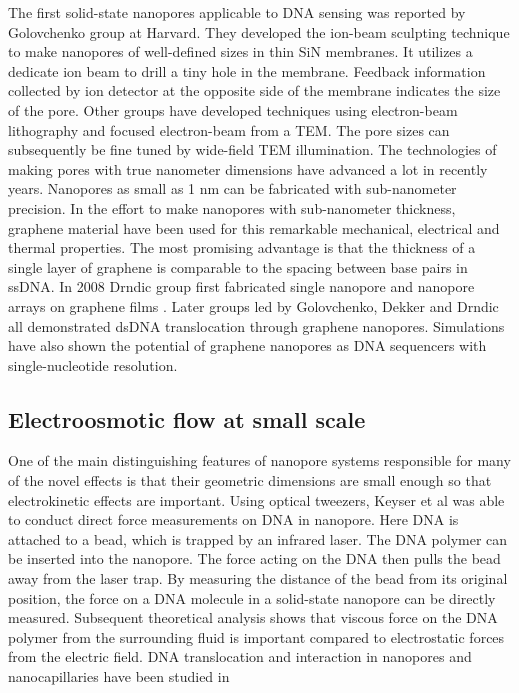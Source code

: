 The first solid-state nanopores applicable to DNA sensing was reported by Golovchenko group at Harvard\cite{Li2001}. They developed the ion-beam sculpting technique to make nanopores of well-defined sizes in thin SiN membranes. It utilizes a dedicate ion beam to drill a tiny hole in the membrane. Feedback information collected by ion detector at the opposite side of the membrane indicates the size of the pore. Other groups have developed techniques using electron-beam lithography and focused electron-beam from a TEM\cite{Dekker2003}. The pore sizes can subsequently be fine tuned by wide-field TEM illumination. The technologies of making pores with true nanometer dimensions have advanced a lot in recently years. Nanopores as small as 1 nm can be fabricated with sub-nanometer precision. In the effort to make nanopores with sub-nanometer thickness, graphene material have been used for this remarkable mechanical, electrical and thermal properties. The most promising advantage is that the thickness of a single layer of graphene is comparable to the spacing between base pairs in ssDNA. In 2008 Drndic group first fabricated single nanopore and nanopore arrays on graphene films \cite{fischbein2008electron}. Later groups led by Golovchenko\cite{Garaj2010}, Dekker\cite{Schneider2010} and Drndic\cite{Merchant2010} all demonstrated dsDNA translocation through graphene nanopores. Simulations have also shown the potential of graphene nanopores as DNA sequencers with single-nucleotide resolution.
 
\subsection{Electroosmotic flow at small scale}
One of the main distinguishing features of nanopore systems responsible for many of the novel effects is that their geometric dimensions are small enough so that electrokinetic effects are important. Using optical tweezers, Keyser et al\cite{Keyser2006,VanDorp2009} was able to conduct direct force measurements on DNA in nanopore. Here DNA is attached to a bead, which is trapped by an infrared laser. The DNA polymer can be inserted into the nanopore. The force acting on the DNA then pulls the bead away from the laser trap. By measuring the distance of the bead from its original position, the force on a DNA molecule in a solid-state nanopore can be directly measured. Subsequent theoretical analysis\cite{ghosal2006electrophoresis,ghosal2007effect,Ghosal2007} shows that viscous force on the DNA polymer from the surrounding fluid is important compared to electrostatic forces from the electric field. DNA translocation and interaction in nanopores and nanocapillaries have been studied in \cite{laohakunakorn2013dna,thacker2012studying,ghosal2012capstan}

